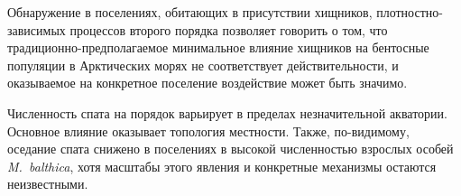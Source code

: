 Обнаружение в поселениях, обитающих в присутствии хищников, плотностно-зависимых процессов второго порядка позволяет говорить о том, что традиционно-предполагаемое минимальное влияние хищников на бентосные популяции в Арктических морях не соответствует действительности, и оказываемое на конкретное поселение воздействие может быть значимо.

Численность спата на порядок варьирует в пределах незначительной акватории.
Основное влияние оказывает топология местности.
Также, по-видимому, оседание спата снижено в поселениях в высокой численностью взрослых особей {\it M.~balthica}, хотя масштабы этого явления и конкретные механизмы остаются неизвестными.


